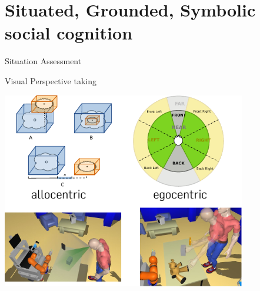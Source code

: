 \documentclass[compress,xcolor=table]{beamer}
\begin{document}
\section[Symbolic cognition]{Situated, Grounded, Symbolic social cognition}


{
\begin{frame}{Situation Assessment}
        \centering
        \\

\end{frame}
}

\begin{frame}{Visual Perspective taking}

        \centering
        \includegraphics[width=0.8\textwidth]{spark_vert.pdf}

\end{frame}
\end{document}
